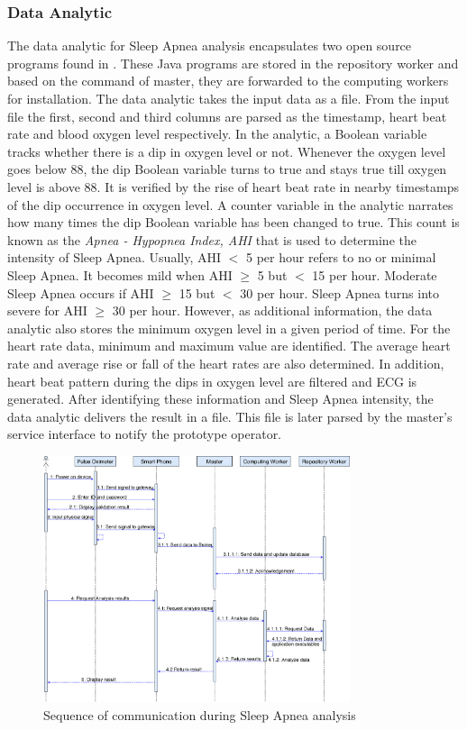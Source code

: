 \documentclass[final,5p,times,twocolumn]{elsarticle}
\begin{document}
\subsubsection{Data Analytic}
The data analytic for Sleep Apnea analysis encapsulates two open source programs found in \cite{link1}\cite{link2}. These Java programs are stored in the repository worker and based on the command of master, they are forwarded to the computing workers for installation. The data analytic takes the input data as a file. From the input file the first, second and third columns are parsed as the timestamp, heart beat rate and blood oxygen level respectively. In the analytic, a Boolean variable tracks whether there is a dip in oxygen level or not. Whenever the oxygen level goes below 88, the dip Boolean variable turns to true and stays true till oxygen level is above 88. It is verified by the rise of heart beat rate in nearby timestamps of the dip occurrence in oxygen level. A counter variable in the analytic narrates how many times the dip Boolean variable has been changed to true. This count is known as the \textit{Apnea - Hypopnea Index, AHI} that is used to determine the intensity of Sleep Apnea. Usually, AHI $<$ 5 per hour refers to no or minimal Sleep Apnea. It becomes mild when AHI $\geq$ 5 but $<$ 15 per hour. Moderate Sleep Apnea occurs if AHI $\geq$ 15 but $<$ 30 per hour. Sleep Apnea turns into severe for AHI $\geq$ 30 per hour. However, as additional information, the data analytic also stores the minimum oxygen level in a given period of time. For the heart rate data, minimum and maximum value are identified. The average heart rate and average rise or fall of the heart rates are also determined. In addition, heart beat pattern during the dips in oxygen level are filtered and ECG is generated. After identifying these information and Sleep Apnea intensity, the data analytic delivers the result in a file. This file is later parsed by the master's service interface to notify the prototype operator.
%
%
\begin{figure}[!t]
\centering 
\includegraphics[width=90mm]{Communication.png}
\caption{Sequence of communication during Sleep Apnea analysis}
\label{Fig:pro_com}
\end{figure}
%
\end{document}
